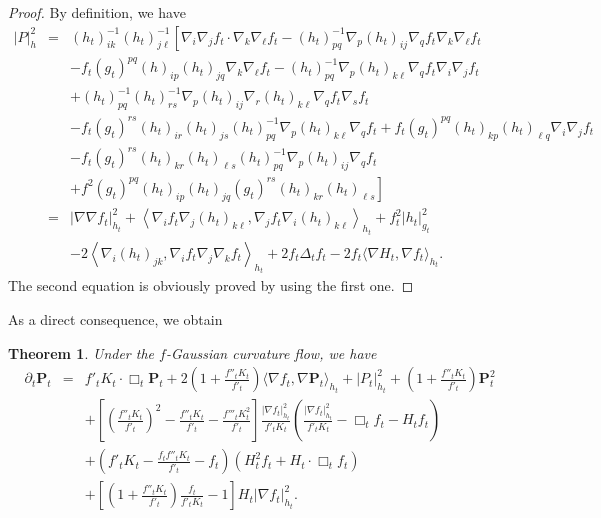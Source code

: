 \documentclass{amsart}
\newtheorem{theorem}{Theorem}[section]
\theoremstyle{definition}
\theoremstyle{remark}
\numberwithin{equation}{section}
\begin{document}
\begin{proof} By definition, we have
\begin{eqnarray*}
|P|^{2}_{h}&=&(h_{t})^{-1}_{ik}(h_{t})^{-1}_{j\ell}\left[\nabla_{i}\nabla_{j}f_{t}\cdot
\nabla_{k}\nabla_{\ell}f_{t}-(h_{t})^{-1}_{pq}\nabla_{p}(h_{t})_{ij}
\nabla_{q}f_{t}\nabla_{k}\nabla_{\ell}f_{t}\right.\\
&&-f_{t}(g_{t})^{pq}(h)_{ip}(h_{t})_{jq}\nabla_{k}\nabla_{\ell}f_{t}
-(h_{t})^{-1}_{pq}\nabla_{p}(h_{t})_{k\ell}\nabla_{q}f_{t}\nabla_{i}
\nabla_{j}f_{t}\\
&&+(h_{t})^{-1}_{pq}(h_{t})^{-1}_{rs}\nabla_{p}(h_{t})_{ij}
\nabla_{r}(h_{t})_{k\ell}\nabla_{q}f_{t}\nabla_{s}f_{t}\\
&&-f_{t}(g_{t})^{rs}(h_{t})_{ir}(h_{t})_{js}(h_{t})^{-1}_{pq}
\nabla_{p}(h_{t})_{k\ell}\nabla_{q}f_{t}+\left.f_{t}(g_{t})^{pq}(h_{t})_{kp}(h_{t})_{\ell q}\nabla_{i}\nabla_{j}f_{t}\right.\\
&&-\left.f_{t}(g_{t})^{rs}(h_{t})_{kr}(h_{t})_{\ell s}(h_{t})^{-1}_{pq}\nabla_{p}(h_{t})_{ij}\nabla_{q}f_{t}\right.\\
&&+\left.f^{2}(g_{t})^{pq}(h_{t})_{ip}(h_{t})_{jq}(g_{t})^{rs}(h_{t})_{kr}(h_{t})_{\ell s}
\right]\\
&=&|\nabla\nabla f_{t}|^{2}_{h_{t}}+\left\langle\nabla_{i}f_{t}\nabla_{j}
(h_{t})_{k\ell},
\nabla_{j}f_{t}\nabla_{i}(h_{t})_{k\ell}\right\rangle_{h_{t}}
+f^{2}_{t}|h_{t}|^{2}_{g_{t}}\\
&&-2\left\langle\nabla_{i}(h_{t})_{jk},\nabla_{i}f_{t}\nabla_{j}\nabla_{k}f_{t}
\right\rangle_{h_{t}}+2f_{t}\Delta_{t} f_{t}-2f_{t}\langle\nabla H_{t},
\nabla f_{t}\rangle_{h_{t}}.
\end{eqnarray*}
The second equation is obviously proved by using the first one.
\end{proof}

As a direct consequence, we obtain

\begin{theorem} \label{t3.5}Under the $f$-Gaussian curvature flow, we have
\begin{eqnarray}
\partial_{t}\mathbf{P}_{t}&=&f'_{t}K_{t}\cdot\Box_{t}\mathbf{P}_{t}
+2\left(1+\frac{f''_{t}K_{t}}{f'_{t}}\right)\langle\nabla f_{t},
\nabla \mathbf{P}_{t}\rangle_{h_{t}}
+|P_{t}|^{2}_{h_{t}}+\left(1+\frac{f''_{t}K_{t}}{f'_{t}}\right)\mathbf{P}^{2}_{t}\nonumber\\
&&+\left[\left(\frac{f''_{t}K_{t}}{f'_{t}}\right)^{2}-\frac{f''_{t}K_{t}}{f'_{t}}
-\frac{f'''_{t}K^{2}_{t}}{f'_{t}}\right]
\frac{|\nabla f_{t}|^{2}_{h_{t}}}{f'_{t}K_{t}}\left(\frac{|\nabla f_{t}|^{2}_{h_{t}}}{f'_{t}K_{t}}-\Box_{t} f_{t}
-H_{t}f_{t}\right)\nonumber\\
&&+\left(f'_{t}K_{t}-\frac{f_{t}f''_{t}K_{t}}{f'_{t}}-f_{t}\right)(H^{2}_{t}f_{t}
+H_{t}\cdot\Box_{t} f_{t})\nonumber\\
&&+\left[\left(1+\frac{f''_{t}K_{t}}{f'_{t}}\right)\frac{f_{t}}{f'_{t}K_{t}}
-1\right]H_{t}|\nabla f_{t}|^{2}_{h_{t}}.
\label{3.11}
\end{eqnarray}
\end{theorem}
\end{document}
